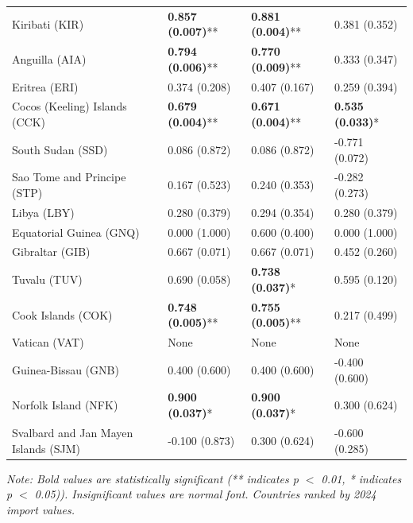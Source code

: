 \begin{longtable}{p{4cm}p{3cm}p{3cm}p{3cm}}
Kiribati (KIR) & \textbf{0.857 (0.007)}** & \textbf{0.881 (0.004)}** & 0.381 (0.352) \\
Anguilla (AIA) & \textbf{0.794 (0.006)}** & \textbf{0.770 (0.009)}** & 0.333 (0.347) \\
Eritrea (ERI) & 0.374 (0.208) & 0.407 (0.167) & 0.259 (0.394) \\
Cocos (Keeling) Islands (CCK) & \textbf{0.679 (0.004)}** & \textbf{0.671 (0.004)}** & \textbf{0.535 (0.033)}* \\
South Sudan (SSD) & 0.086 (0.872) & 0.086 (0.872) & -0.771 (0.072) \\
Sao Tome and Principe (STP) & 0.167 (0.523) & 0.240 (0.353) & -0.282 (0.273) \\
Libya (LBY) & 0.280 (0.379) & 0.294 (0.354) & 0.280 (0.379) \\
Equatorial Guinea (GNQ) & 0.000 (1.000) & 0.600 (0.400) & 0.000 (1.000) \\
Gibraltar (GIB) & 0.667 (0.071) & 0.667 (0.071) & 0.452 (0.260) \\
Tuvalu (TUV) & 0.690 (0.058) & \textbf{0.738 (0.037)}* & 0.595 (0.120) \\
Cook Islands (COK) & \textbf{0.748 (0.005)}** & \textbf{0.755 (0.005)}** & 0.217 (0.499) \\
Vatican (VAT) & None & None & None \\
Guinea-Bissau (GNB) & 0.400 (0.600) & 0.400 (0.600) & -0.400 (0.600) \\
Norfolk Island (NFK) & \textbf{0.900 (0.037)}* & \textbf{0.900 (0.037)}* & 0.300 (0.624) \\
Svalbard and Jan Mayen Islands (SJM) & -0.100 (0.873) & 0.300 (0.624) & -0.600 (0.285) \\
\end{longtable}

\textit{Note: Bold values are statistically significant (** indicates p $<$ 0.01, * indicates p $<$ 0.05)). Insignificant values are normal font. Countries ranked by 2024 import values.}